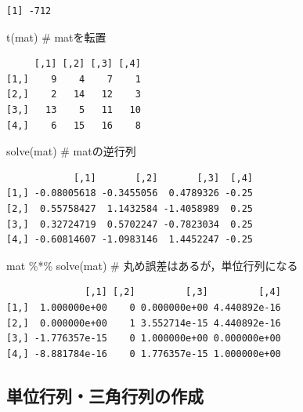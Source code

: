 \documentclass[
  letterpaper,
  DIV=11,
  numbers=noendperiod]{scrreprt}
\newenvironment{Shaded}{\begin{snugshade}}{\end{snugshade}}
\newcommand{\CommentTok}[1]{\textcolor[rgb]{0.37,0.37,0.37}{#1}}
\newcommand{\FunctionTok}[1]{\textcolor[rgb]{0.28,0.35,0.67}{#1}}
\newcommand{\NormalTok}[1]{\textcolor[rgb]{0.00,0.23,0.31}{#1}}
\newcommand{\SpecialCharTok}[1]{\textcolor[rgb]{0.37,0.37,0.37}{#1}}
\begin{document}
\begin{verbatim}
[1] -712
\end{verbatim}

\begin{Shaded}
\begin{Highlighting}[]
\FunctionTok{t}\NormalTok{(mat) }\CommentTok{\# matを転置}
\end{Highlighting}
\end{Shaded}

\begin{verbatim}
     [,1] [,2] [,3] [,4]
[1,]    9    4    7    1
[2,]    2   14   12    3
[3,]   13    5   11   10
[4,]    6   15   16    8
\end{verbatim}

\begin{Shaded}
\begin{Highlighting}[]
\FunctionTok{solve}\NormalTok{(mat) }\CommentTok{\# matの逆行列}
\end{Highlighting}
\end{Shaded}

\begin{verbatim}
            [,1]       [,2]       [,3]  [,4]
[1,] -0.08005618 -0.3455056  0.4789326 -0.25
[2,]  0.55758427  1.1432584 -1.4058989  0.25
[3,]  0.32724719  0.5702247 -0.7823034  0.25
[4,] -0.60814607 -1.0983146  1.4452247 -0.25
\end{verbatim}

\begin{Shaded}
\begin{Highlighting}[]
\NormalTok{mat }\SpecialCharTok{\%*\%} \FunctionTok{solve}\NormalTok{(mat) }\CommentTok{\# 丸め誤差はあるが，単位行列になる}
\end{Highlighting}
\end{Shaded}

\begin{verbatim}
              [,1] [,2]         [,3]         [,4]
[1,]  1.000000e+00    0 0.000000e+00 4.440892e-16
[2,]  0.000000e+00    1 3.552714e-15 4.440892e-16
[3,] -1.776357e-15    0 1.000000e+00 0.000000e+00
[4,] -8.881784e-16    0 1.776357e-15 1.000000e+00
\end{verbatim}

\hypertarget{ux5358ux4f4dux884cux5217ux4e09ux89d2ux884cux5217ux306eux4f5cux6210}{%
\subsection{単位行列・三角行列の作成}\label{ux5358ux4f4dux884cux5217ux4e09ux89d2ux884cux5217ux306eux4f5cux6210}}
\end{document}
